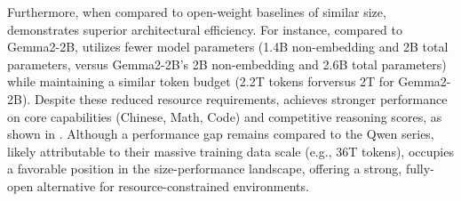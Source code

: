 Furthermore, when compared to open-weight baselines of similar size, \sys demonstrates superior architectural efficiency. 
For instance, compared to Gemma2-2B, \sys utilizes fewer model parameters (1.4B non-embedding and 2B total parameters, versus Gemma2-2B's 2B non-embedding and 2.6B total parameters) while maintaining a similar token budget (2.2T tokens for\sys versus 2T for Gemma2-2B). 
Despite these reduced resource requirements, \sys achieves stronger performance on core capabilities (Chinese, Math, Code) and competitive reasoning scores, as shown in . 
Although a performance gap remains compared to the Qwen series, likely attributable to their massive training data scale (e.g., 36T tokens), \sys occupies a favorable position in the size-performance landscape, offering a strong, fully-open alternative for resource-constrained environments.


















